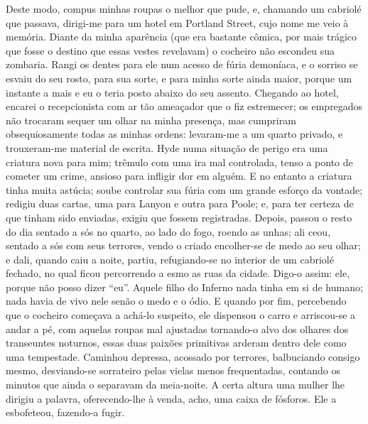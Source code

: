 Deste modo, compus minhas roupas o melhor que pude, e, chamando um
cabriolé que passava, dirigi-me para um hotel em Portland Street, cujo
nome me veio à memória.  Diante da minha aparência (que era bastante
cômica, por mais trágico que fosse o destino que essas vestes
revelavam) o cocheiro não escondeu sua zombaria.  Rangi os dentes para
ele num acesso de fúria demoníaca, e o sorriso se esvaiu do seu rosto,
para sua sorte, e para minha sorte ainda maior, porque um instante a
mais e eu o teria posto abaixo do seu assento.  Chegando ao hotel,
encarei o recepcionista com ar tão ameaçador que o fiz estremecer; os
empregados não trocaram sequer um olhar na minha presença, mas
cumpriram obsequiosamente todas as minhas ordens: levaram-me a um
quarto privado, e trouxeram-me material de escrita.  Hyde numa situação
de perigo era uma criatura nova para mim; trêmulo com uma ira mal
controlada, tenso a ponto de cometer um crime, ansioso para infligir
dor em alguém.  E no entanto a criatura tinha muita astúcia; soube
controlar sua fúria com um grande esforço da vontade; redigiu duas
cartas, uma para Lanyon e outra para Poole; e, para ter certeza de que
tinham sido enviadas, exigiu que fossem registradas.  Depois, passou o
resto do dia sentado a sós no quarto, ao lado do fogo, roendo as unhas;
 ali ceou, sentado a sós com seus terrores, vendo o criado encolher-se
de medo ao seu olhar; e dali, quando caiu a noite, partiu,
refugiando-se no interior de um cabriolé fechado, no qual ficou
percorrendo a esmo as ruas da cidade.  Digo-o assim: ele, porque não
posso dizer “eu”.  Aquele filho do Inferno nada tinha em si de humano;
nada havia de vivo nele senão o medo e o ódio.  E quando por fim,
percebendo que o cocheiro começava a achá-lo suspeito, ele dispensou o
carro e arriscou-se a andar a pé, com aquelas roupas mal ajustadas
tornando-o alvo dos olhares dos transeuntes noturnos, essas duas
paixões primitivas arderam dentro dele como uma tempestade.  Caminhou
depressa, acossado por terrores, balbuciando consigo mesmo,
desviando-se sorrateiro pelas vielas menos frequentadas, contando os
minutos que ainda o separavam da meia-noite.  A certa altura uma mulher
lhe dirigiu a palavra, oferecendo-lhe à venda, acho, uma caixa de
fósforos. Ele a esbofeteou, fazendo-a fugir.


